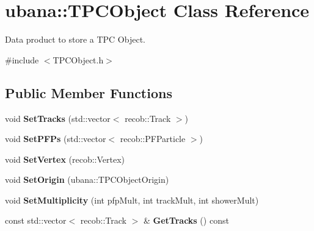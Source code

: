 \hypertarget{classubana_1_1TPCObject}{\section{ubana\-:\-:\-T\-P\-C\-Object \-Class \-Reference}
\label{classubana_1_1TPCObject}
}


\-Data product to store a \-T\-P\-C \-Object.  




{\ttfamily \#include $<$\-T\-P\-C\-Object.\-h$>$}

\subsection*{\-Public \-Member \-Functions}
\begin{DoxyCompactItemize}
\item 
\hypertarget{classubana_1_1TPCObject_a0766c8648ada3d539b474e40a107d8c1}{void {\bfseries \-Set\-Tracks} (std\-::vector$<$ recob\-::\-Track $>$)}\label{classubana_1_1TPCObject_a0766c8648ada3d539b474e40a107d8c1}

\item 
\hypertarget{classubana_1_1TPCObject_ab35b580187ad16cbd53325e8c776f655}{void {\bfseries \-Set\-P\-F\-Ps} (std\-::vector$<$ recob\-::\-P\-F\-Particle $>$)}\label{classubana_1_1TPCObject_ab35b580187ad16cbd53325e8c776f655}

\item 
\hypertarget{classubana_1_1TPCObject_a1fed8d9f87fc301a8cbee484a8434a05}{void {\bfseries \-Set\-Vertex} (recob\-::\-Vertex)}\label{classubana_1_1TPCObject_a1fed8d9f87fc301a8cbee484a8434a05}

\item 
\hypertarget{classubana_1_1TPCObject_ad4946cb455555486b701dd1301a26f56}{void {\bfseries \-Set\-Origin} (ubana\-::\-T\-P\-C\-Object\-Origin)}\label{classubana_1_1TPCObject_ad4946cb455555486b701dd1301a26f56}

\item 
\hypertarget{classubana_1_1TPCObject_aad67da2b0cd00fb82f8eb4d8f87bf18f}{void {\bfseries \-Set\-Multiplicity} (int pfp\-Mult, int track\-Mult, int shower\-Mult)}\label{classubana_1_1TPCObject_aad67da2b0cd00fb82f8eb4d8f87bf18f}

\item 
\hypertarget{classubana_1_1TPCObject_a44cc29b00093d89d9f7fe834570d77be}{const std\-::vector$<$ recob\-::\-Track $>$ \& {\bfseries \-Get\-Tracks} () const }\label{classubana_1_1TPCObject_a44cc29b00093d89d9f7fe834570d77be}


\end{DoxyCompactItemize}
